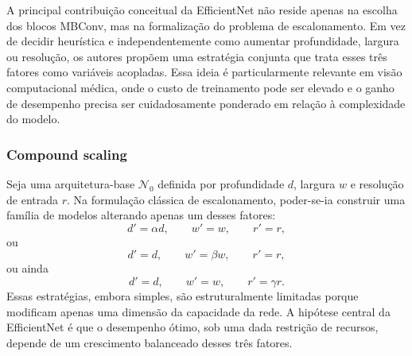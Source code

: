\documentclass[tcc,capa]{texufpel}
\begin{document}
A principal contribuição conceitual da EfficientNet não reside apenas na escolha dos blocos MBConv, mas na formalização do problema de escalonamento. Em vez de decidir heurística e independentemente como aumentar profundidade, largura ou resolução, os autores propõem uma estratégia conjunta que trata esses três fatores como variáveis acopladas. Essa ideia é particularmente relevante em visão computacional médica, onde o custo de treinamento pode ser elevado e o ganho de desempenho precisa ser cuidadosamente ponderado em relação à complexidade do modelo.

\subsubsection{Compound scaling}

Seja uma arquitetura-base \( \mathcal{N}_0 \) definida por profundidade \(d\), largura \(w\) e resolução de entrada \(r\). Na formulação clássica de escalonamento, poder-se-ia construir uma família de modelos alterando apenas um desses fatores:
\begin{equation}
	d' = \alpha d, \qquad w' = w, \qquad r' = r,
\end{equation}
ou
\begin{equation}
	d' = d, \qquad w' = \beta w, \qquad r' = r,
\end{equation}
ou ainda
\begin{equation}
	d' = d, \qquad w' = w, \qquad r' = \gamma r.
\end{equation}
Essas estratégias, embora simples, são estruturalmente limitadas porque modificam apenas uma dimensão da capacidade da rede. A hipótese central da EfficientNet é que o desempenho ótimo, sob uma dada restrição de recursos, depende de um crescimento balanceado desses três fatores.
\end{document}

